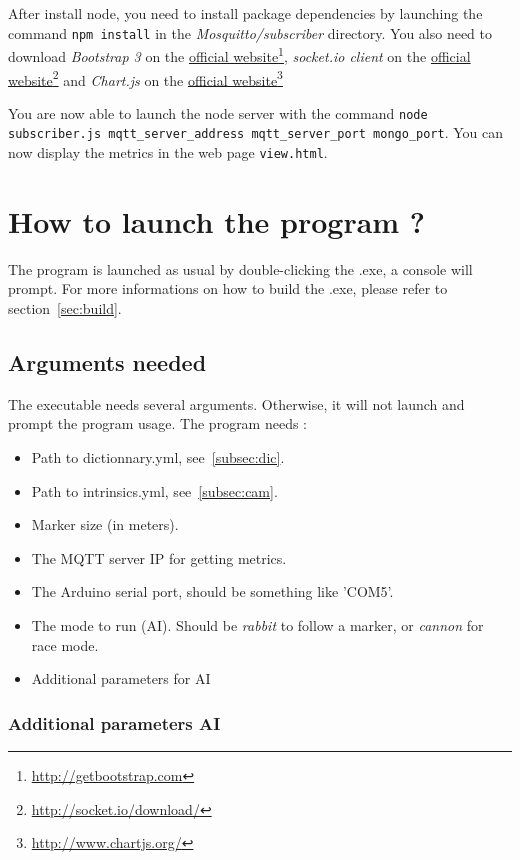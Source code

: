 \documentclass[a4paper,11pt]{report}
\begin{document}
After install node, you need to install package dependencies by launching the
command \texttt{npm install} in the \emph{Mosquitto/subscriber} directory. You
also need to download \emph{Bootstrap 3} on the
\href{http://getbootstrap.com/}{official
website}\footnote{\url{http://getbootstrap.com}}, \emph{socket.io client} on
the \href{http://socket.io/download/}{official
website}\footnote{\url{http://socket.io/download/}} and \emph{Chart.js} on the
\href{http://www.chartjs.org/}{official
website}\footnote{\url{http://www.chartjs.org/}}

You are now able to launch the node server with the command \texttt{node
subscriber.js mqtt\_server\_address mqtt\_server\_port mongo\_port}. You can
now display the metrics in the web page \texttt{view.html}.

\section{How to launch the program ?}

The program is launched as usual by double-clicking the .exe, a console will
prompt.  For more informations on how to build the .exe, please refer to
section~\ref{sec:build}.

\subsection{Arguments needed}

The executable needs several arguments. Otherwise, it will not launch and
prompt the program usage.
The program needs :

\begin{itemize}
    \item Path to dictionnary.yml, see~\ref{subsec:dic}.
    \item Path to intrinsics.yml, see~\ref{subsec:cam}.
    \item Marker size (in meters).
    \item The MQTT server IP for getting metrics.
    \item The Arduino serial port, should be something like 'COM5'.
    \item The mode to run (AI). Should be \emph{rabbit} to follow a marker, or
        \emph{cannon} for race mode.
    \item Additional parameters for AI
\end{itemize}

\subsubsection{Additional parameters AI}
\end{document}
